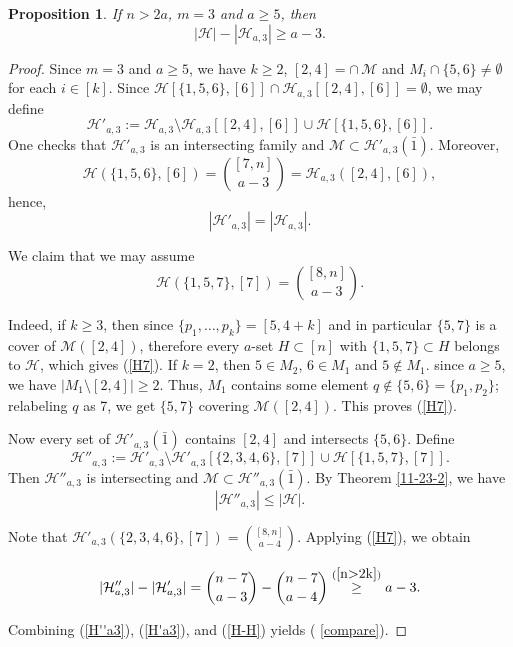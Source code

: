 \documentclass[11pt]{article}
\newcommand{\m}{\mathcal}
\newtheorem{proposition}[theorem]{Proposition}
\begin{document}
\begin{proposition}
  If $n>2a$, $m=3$ and $a\ge 5$, then 
  \begin{equation}\label{compare}
      |\m H|-|\m H_{a,3}|\ge a-3.
  \end{equation}
\end{proposition}

\begin{proof}
Since $m=3$ and $a\ge 5$, we have $k\ge 2$, $[2,4]=\cap \, \m M$ and $M_i \cap \{5,6\}\ne \emptyset$ for each $i\in [k]$. 
Since $\m H[\{1,5,6\},[6]] \cap \m H_{a,3}[[2,4],[6]]=\emptyset$, we may define 
\[
\m H'_{a,3}:=\m H_{a,3}\setminus \m H_{a,3}[[2,4],[6]] \cup \m H[\{1,5,6\},[6]].
\]
One checks that $\m H'_{a,3}$ is an intersecting family and $\m M \subset \m H'_{a,3}(\bar{1})$. 
Moreover, 
$$\m H(\{1,5,6\},[6])={[7,n]\choose a-3}=\m H_{a,3}([2,4],[6]),$$
hence,
\begin{equation}\label{H'a3}
|\m H'_{a,3}|=|\m H_{a,3}|. 
\end{equation}


We claim that we may assume 
\begin{equation}\label{H7}
    \m H(\{1,5,7\},[7])={[8,n]\choose a-3}.
\end{equation}
     
Indeed, if $k\ge 3$, then since $\{p_1, \dots, p_k\}=[5, 4+k]$ and in particular $\{5,7\}$ is a cover of $\m M([2,4])$, therefore every $a$-set $H\subset [n]$ with $\{1,5,7\}\subset H$ belongs to $\m H$, which gives (\ref{H7}). 
If $k=2$, then $5\in M_2$, $6\in M_1$ and $5\not\in M_1$.
since $a\ge 5$, we have $|M_1\setminus [2,4]|\ge 2$.  Thus, $M_1$ contains some element $q\not\in \{5,6\}=\{p_1,p_2\}$; relabeling $q$ as 7, we get $\{5,7\}$ covering $\m M([2,4])$.
This proves (\ref{H7}). 

Now every set of $\m H'_{a,3}(\bar{1})$ contains $[2,4]$ and intersects $\{5,6\}$. 
Define 
\[
\m H''_{a,3}:=\m H'_{a,3}\setminus \m H'_{a,3}[\{2,3,4,6\},[7] ]\cup \m H[\{1,5,7\},[7]].
\]
Then $\m H''_{a,3}$ is intersecting and $\m M \subset \m H''_{a,3}(\bar{1})$. By Theorem \ref{11-23-2}, we have
\begin{equation}\label{H''a3}
|\m H''_{a,3}|\le |\m H|.
\end{equation}

Note that $\m H'_{a,3}(\{2,3,4,6\},[7] )={[8,n]\choose a-4}$. 
Applying (\ref{H7}), we obtain

\begin{equation}\label{H-H}
    |\m H''_{a,3}|-|\m H'_{a,3}|={n-7\choose a-3}-{n-7\choose a-4}\overset{(\ref{n>2k})}{\ge} a-3.
\end{equation}


Combining (\ref{H''a3}), (\ref{H'a3}), and (\ref{H-H}) yields ( \ref{compare}).
\end{proof}
\end{document}
